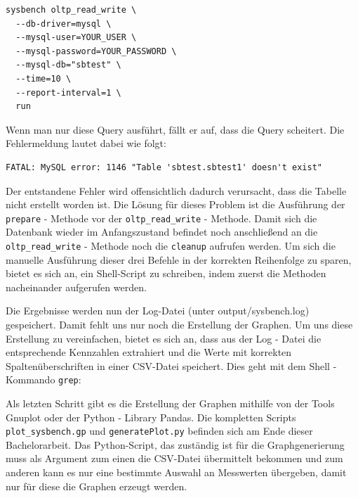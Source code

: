 \begin{lstlisting}[style=custom_daniel,label={lst:sysbenchrun}]
sysbench oltp_read_write \
  --db-driver=mysql \
  --mysql-user=YOUR_USER \
  --mysql-password=YOUR_PASSWORD \
  --mysql-db="sbtest" \
  --time=10 \
  --report-interval=1 \
  run
\end{lstlisting}

Wenn man nur diese Query ausführt, fällt er auf, dass die Query scheitert.
Die Fehlermeldung lautet dabei wie folgt:
\begin{lstlisting}[style=custom_daniel,label={lst:error_withoutprepare}]
FATAL: MySQL error: 1146 "Table 'sbtest.sbtest1' doesn't exist"
\end{lstlisting}
Der entstandene Fehler wird offensichtlich dadurch verursacht, dass die Tabelle nicht erstellt worden ist.
Die Lösung für dieses Problem ist die Ausführung der \texttt{prepare} - Methode vor der \texttt{oltp\_read\_write} - Methode.
Damit sich die Datenbank wieder im Anfangszustand befindet noch anschließend an die \texttt{oltp\_read\_write} - Methode noch die \texttt{cleanup} aufrufen werden.
Um sich die manuelle Ausführung dieser drei Befehle in der korrekten Reihenfolge zu sparen, bietet es sich an, ein Shell-Script zu schreiben, indem zuerst die Methoden nacheinander aufgerufen werden.



Die Ergebnisse werden nun der Log-Datei (unter output/sysbench.log) gespeichert.
Damit fehlt uns nur noch die Erstellung der Graphen.
Um uns diese Erstellung zu vereinfachen, bietet es sich an, dass aus der Log - Datei die entsprechende Kennzahlen extrahiert und die Werte mit korrekten Spaltenüberschriften in einer CSV-Datei speichert.
Dies geht mit dem Shell - Kommando \texttt{grep}:



Als letzten Schritt gibt es die Erstellung der Graphen mithilfe von der Tools Gnuplot oder der Python - Library Pandas.
Die kompletten Scripts \texttt{plot\_sysbench.gp} und \texttt{generatePlot.py} befinden sich am Ende dieser Bachelorarbeit.
Das Python-Script, das zuständig ist für die Graphgenerierung muss als Argument zum einen die CSV-Datei übermittelt bekommen und zum anderen kann es nur eine bestimmte Auswahl an Messwerten übergeben, damit nur für diese die Graphen erzeugt werden.

